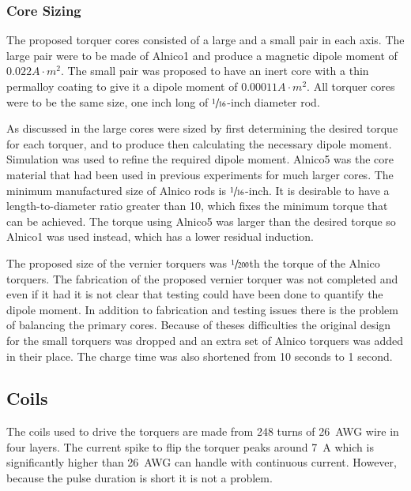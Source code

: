 \subsubsection{Core Sizing}

The proposed torquer cores consisted of a large and a small pair in each axis. The large pair were to be made of Alnico1 and produce a magnetic dipole moment of $0.022 \unit{A \cdot m^2}$. The small pair was proposed to have an inert core with a thin permalloy coating to give it a dipole moment of $0.00011 \unit{A \cdot m^2}$. All torquer cores were to be the same size, one inch long of $\sfrac{1}{16}$-inch diameter rod.

As discussed in \cite{Mentch11} the large cores were sized by first determining the desired torque for each torquer, and to produce then calculating the necessary dipole moment. Simulation was used to refine the required dipole moment. Alnico5 was the core material that had been used in previous experiments for much larger cores\cite{Mentch11}. The minimum manufactured size of Alnico rods is $\sfrac{1}{16}$-inch. It is desirable to have a length-to-diameter ratio greater than 10, which fixes the minimum torque that can be achieved. The torque using Alnico5 was larger than the desired torque so Alnico1 was used instead, which has a lower residual induction. 

The proposed size of the vernier torquers was $\sfrac{1}{200}$th the torque of the Alnico torquers. The fabrication of the proposed vernier torquer was not completed and even if it had it is not clear that testing could have been done to quantify the dipole moment. In addition to fabrication and testing issues there is the problem of balancing the primary cores. Because of theses difficulties the original design for the small torquers was dropped and an extra set of Alnico torquers was added in their place. The charge time was also shortened from 10 seconds to 1 second.

\subsection{Coils}

The coils used to drive the torquers are made from 248 turns of 26~AWG wire in four layers. The current spike to flip the torquer peaks around 7~A which is significantly higher than 26~AWG can handle with continuous current. However, because the pulse duration is short it is not a problem.

